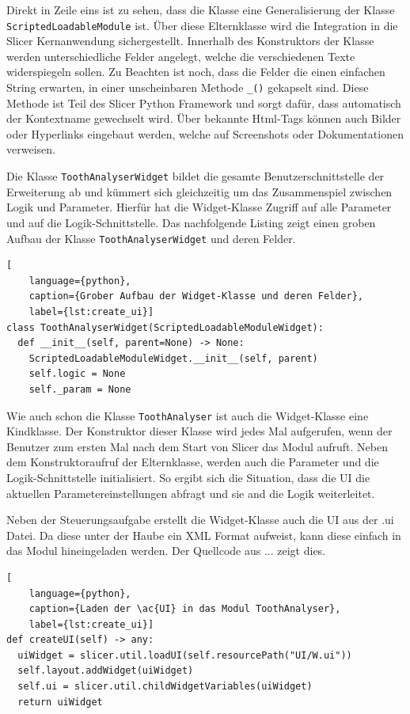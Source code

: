 Direkt in Zeile eins ist zu sehen, dass die Klasse eine Generalisierung der Klasse
\texttt{ScriptedLoadableModule} ist. Über diese Elternklasse wird die Integration
in die Slicer Kernanwendung sichergestellt. Innerhalb des Konstruktors der
Klasse werden unterschiedliche Felder angelegt, welche die verschiedenen Texte widerspiegeln
sollen. Zu Beachten ist noch, dass die Felder die einen einfachen String erwarten,
in einer unscheinbaren Methode \texttt{\_()} gekapselt sind. Diese Methode ist
Teil des Slicer Python Framework und sorgt dafür, dass automatisch der Kontextname
gewechselt wird. Über bekannte Html-Tags können auch Bilder oder Hyperlinks
eingebaut werden, welche auf Screenshots oder Dokumentationen verweisen.

Die Klasse \texttt{ToothAnalyserWidget} bildet die gesamte Benutzerschnittstelle
der Erweiterung ab und kümmert sich gleichzeitig um das Zusammenspiel zwischen
Logik und Parameter. Hierfür hat die Widget-Klasse Zugriff auf alle Parameter und
auf die Logik-Schnittstelle. Das nachfolgende Listing zeigt einen groben Aufbau
der Klasse \texttt{ToothAnalyserWidget} und deren Felder.

\begin{lstlisting}[
    language={python},
    caption={Grober Aufbau der Widget-Klasse und deren Felder},
    label={lst:create_ui}]
class ToothAnalyserWidget(ScriptedLoadableModuleWidget):
  def __init__(self, parent=None) -> None:
    ScriptedLoadableModuleWidget.__init__(self, parent)
    self.logic = None
    self._param = None
\end{lstlisting}

Wie auch schon die Klasse \texttt{ToothAnalyser} ist auch die Widget-Klasse eine
Kindklasse. Der Konstruktor dieser Klasse wird jedes Mal aufgerufen, wenn der Benutzer
zum ersten Mal nach dem Start von Slicer das Modul aufruft. Neben dem
Konstruktoraufruf der Elternklasse, werden auch die Parameter und die Logik-Schnittstelle
initialisiert. So ergibt sich die Situation, dass die UI die aktuellen Parametereinstellungen
abfragt und sie and die Logik weiterleitet.

Neben der Steuerungsaufgabe erstellt die Widget-Klasse auch die UI aus der .ui
Datei. Da diese unter der Haube ein XML Format aufweist, kann diese einfach in
das Modul hineingeladen werden. Der Quellcode aus ... zeigt dies.

\begin{lstlisting}[
    language={python},
    caption={Laden der \ac{UI} in das Modul ToothAnalyser},
    label={lst:create_ui}]
def createUI(self) -> any:
  uiWidget = slicer.util.loadUI(self.resourcePath("UI/W.ui"))
  self.layout.addWidget(uiWidget)
  self.ui = slicer.util.childWidgetVariables(uiWidget)
  return uiWidget
\end{lstlisting}

